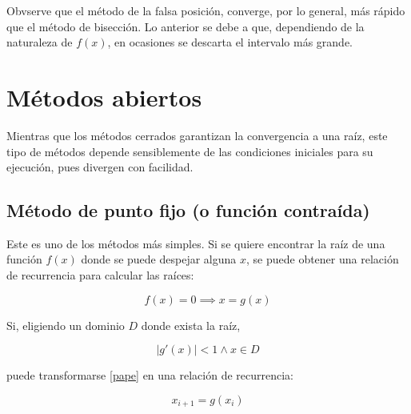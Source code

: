 Obvserve que el método de la falsa posición, converge, por lo general, más
rápido que el método de bisección. Lo anterior se debe a que, dependiendo de la
naturaleza de $f(x)$, en ocasiones se descarta el intervalo más grande.


\section{Métodos abiertos}

Mientras que los métodos cerrados garantizan la convergencia a una raíz, este
tipo de métodos depende sensiblemente de las condiciones iniciales para su
ejecución, pues divergen con facilidad.

\subsection{Método de punto fijo (o función contraída)}

Este es uno de los métodos más simples. Si se quiere encontrar la raíz de una
función $f(x)$ donde se puede despejar alguna $x$, se puede obtener una
relación de recurrencia para calcular las raíces:

\begin{equation}\label{pape}
	f(x) = 0 \implies \boxed{x = g(x)}
\end{equation}

Si, eligiendo un dominio $D$ donde exista la raíz,

\[
	\left| g'(x) \right| < 1 \land x \in D
\]

puede transformarse \ref{pape} en una relación de recurrencia:

\[
	x_{i+1} = g(x_i)
\]

